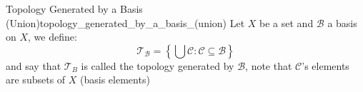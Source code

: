 \begin{definition}
{Topology Generated by a Basis
    (Union)}{topology_generated_by_a_basis_(union)}
    Let \(X\) be a set and \(\mathcal{B}\) a basis on \(X\), we define:
    \[
    \mathcal{T}_{\mathcal{B}} = \left\{\bigcup \mathcal{C}: \mathcal{C}
    \subseteq \mathcal{B} \right\}
    \]
    and say that \(\mathcal{T} _{B}\) is called the topology generated by \(
    \mathcal{B}\), note that \(\mathcal{C} \)'s elements are subsets of \(
    X \) (basis elements)
\end{definition}
